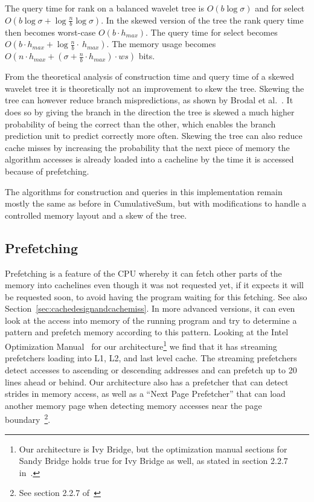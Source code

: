 The query time for rank on a balanced wavelet tree is $O(b \log \sigma)$ and for select $O(b \log \sigma + \log \frac{n}{b} \log \sigma)$.
In the skewed version of the tree the rank query time then becomes worst-case $O(b \cdot h_{max})$. The query time for select becomes $O(b \cdot h_{max} + \log \frac{n}{b} \cdot~h_{max})$.
The memory usage becomes 
$O(n \cdot h_{max} + (\sigma + \frac{n}{b} \cdot h_{max}) \cdot \mathit{ws})$ bits.


From the theoretical analysis of construction time and query time of a skewed wavelet tree it is theoretically not an improvement to skew the tree.
Skewing the tree can however reduce branch mispredictions, as shown by Brodal et al.~.
It does so by giving the branch in the direction the tree is skewed a much higher probability of being the correct than the other, which enables the branch prediction unit to predict correctly more often. 
Skewing the tree can also reduce cache misses by increasing the probability that the next piece of memory the algorithm accesses is already loaded into a cacheline by the time it is accessed because of prefetching.

The algorithms for construction and queries in this implementation remain mostly the same as before in CumulativeSum, but with modifications to handle a controlled memory layout and a skew of the tree.

\subsection{Prefetching}
Prefetching is a feature of the CPU whereby it can fetch other parts of the memory into cachelines even though it was not requested yet, if it expects it will be requested soon, to avoid having the program waiting for this fetching.
See also Section~\ref{sec:cachedesignandcachemiss}.
In more advanced versions, it can even look at the access into memory of the running program and try to determine a pattern and prefetch memory according to this pattern.
Looking at the Intel Optimization Manual~ for our architecture\footnote{Our architecture is Ivy Bridge, but the optimization manual sections for Sandy Bridge holds true for Ivy Bridge as well, as stated in section 2.2.7 in~.} we find that it has streaming prefetchers loading into L1, L2, and last level cache. The streaming prefetchers detect accesses to ascending or descending addresses and can prefetch up to 20 lines ahead or behind. 
Our architecture also has a prefetcher that can detect strides in memory access, as well as a “Next Page Prefetcher” that can load another memory page when detecting memory accesses near the page boundary~\footnote{See section 2.2.7 of~}.


